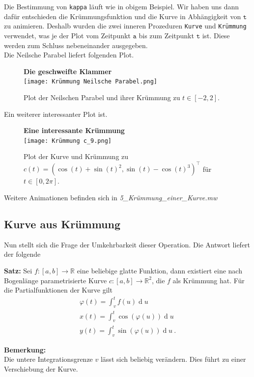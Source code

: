 \documentclass[12pt]{article}
\renewcommand{\d}{\operatorname{d}}
\newenvironment{Kasten}{\begin{mdframed}[linewidth=1pt]}{\end{mdframed}}
\newenvironment{Fig}{\begin{figure}[H]
\begin{center}}{\end{center}\end{figure}}
\begin{document}
Die Bestimmung von \texttt{kappa} läuft wie in obigem Beispiel. Wir haben uns dann dafür entschieden die Krümmungsfunktion und die Kurve in Abhängigkeit von $\mathtt{t}$ zu animieren. Deshalb wurden die zwei inneren Prozeduren \texttt{Kurve} und \texttt{Krümmung} verwendet, was je der Plot vom Zeitpunkt $\mathtt{a}$ bis zum Zeitpunkt $\mathtt{t}$ ist. Diese werden zum Schluss nebeneinander ausgegeben.\\

Die Neilsche Parabel liefert folgenden Plot.
\begin{Fig}
\textbf{Die geschweifte Klammer}\\
\texttt{[image: Krümmung Neilsche Parabel.png]}
\caption{Plot der Neilschen Parabel und ihrer Krümmung zu $t \in [-2,2]$.}
\label{fig:Die geschweifte Klammer}
\end{Fig}

Ein weiterer interessanter Plot ist.
\begin{Fig}
\textbf{Eine interessante Krümmung}\\
\texttt{[image: Krümmung c\_9.png]}
\caption{Plot der Kurve und Krümmung zu \\$c(t) = (\cos(t) + \sin(t)^2, \sin(t) - \cos(t)^3)^\top$ für $t \in [0,2\pi]$.}
\label{fig:Eine interessante Krümmung}
\end{Fig}

Weitere Animationen befinden sich in \textit{5\_Krümmung\_einer\_Kurve.mw}
\subsection{Kurve aus Krümmung}
Nun stellt sich die Frage der Umkehrbarkeit dieser Operation. Die Antwort liefert der folgende
\begin{Kasten}
\textbf{Satz:} Sei $f: [a,b] \rightarrow \mathbb{R}$ eine beliebige glatte Funktion, dann existiert eine nach Bogenlänge parametrisierte Kurve $c : [a,b] \rightarrow \mathbb{R}^2$, die $f$ als Krümmung hat. Für die Partialfunktionen der Kurve gilt
\begin{align*}
\varphi(t) = \int_v^t f(u) \d u\\
x(t) = \int_v^t \cos(\varphi(u)) \d u\\
y(t) = \int_v^t \sin(\varphi(u)) \d u~.
\end{align*}
\end{Kasten}

\textbf{Bemerkung:}\\
Die untere Integrationsgrenze $v$ lässt sich beliebig verändern. Dies führt zu einer Verschiebung der Kurve.\\
\end{document}
